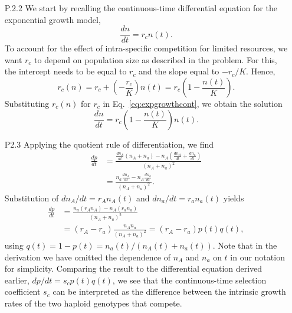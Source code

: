 \begin{enumerate}
		\item[P.2.2] We start by recalling the continuous-time differential equation for the exponential growth model,
		\begin{equation}
			\label{eq:expgrowthcont}
			\frac{dn}{dt} = r_c n(t).
		\end{equation}
		To account for the effect of intra-specific competition for limited resources, we want $r_c$ to depend on population size as described in the problem. For this, the intercept needs to be equal to $r_c$ and the slope equal to $-r_c/K$. Hence,
		\begin{equation}
			r_c(n) = r_c + \left(-\frac{r_c}{K}\right) n(t) = r_c \left( 1 - \frac{n(t)}{K}\right).
		\end{equation}
		Substituting $r_c(n)$ for $r_c$ in Eq.\ \eqref{eq:expgrowthcont}, we obtain the solution
		\begin{equation}
			\frac{dn}{dt} = r_c \left( 1 - \frac{n(t)}{K}\right) n(t).
		\end{equation}
		
		\item[P2.3] Applying the quotient rule of differentiation, we find
		\begin{equation}
		\begin{split}
			\frac{dp}{dt} & = \frac{\frac{d n_A}{dt} \left(n_A + n_a \right) - n_A \left(\frac{d n_A}{dt} + \frac{d n_a}{dt} \right)}{\left(n_A + n_a \right)^2}\\
			& = \frac{n_a \frac{d n_A}{dt} - n_A \frac{d n_a}{dt}}{\left(n_A + n_a \right)^2}.
		\end{split}
		\end{equation}
		Substitution of $d n_A / dt = r_A n_A(t)$ and $d n_a / dt = r_a n_a(t)$ yields
		\begin{equation}
		\begin{split}
			\frac{dp}{dt} & = \frac{n_a (r_A n_A) - n_A (r_a n_a)}{\left(n_A + n_a \right)^2} \\
			& = (r_A - r_a) \frac{n_A n_a}{\left(n_A + n_a \right)^2} = (r_A - r_a) p(t) q(t),
		\end{split}
		\end{equation}
		using $q(t) = 1 - p(t) = n_a(t) / (n_A(t) + n_a(t))$. Note that in the derivation we have omitted the dependence of $n_A$ and $n_a$ on $t$ in our notation for simplicity. Comparing the result to the differential equation derived earlier, $dp / dt = s_c p(t) q(t)$, we see that the continuous-time selection coefficient $s_c$ can be interpreted as the difference between the intrinsic growth rates of the two haploid genotypes that compete.
\end{enumerate}